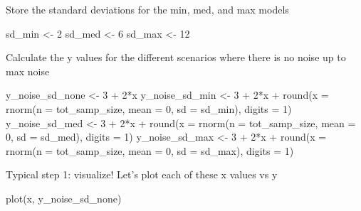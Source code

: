 \documentclass[
]{book}
\newenvironment{Shaded}{\begin{snugshade}}{\end{snugshade}}
\newcommand{\AttributeTok}[1]{\textcolor[rgb]{0.77,0.63,0.00}{#1}}
\newcommand{\DecValTok}[1]{\textcolor[rgb]{0.00,0.00,0.81}{#1}}
\newcommand{\FunctionTok}[1]{\textcolor[rgb]{0.00,0.00,0.00}{#1}}
\newcommand{\NormalTok}[1]{#1}
\newcommand{\OtherTok}[1]{\textcolor[rgb]{0.56,0.35,0.01}{#1}}
\newcommand{\SpecialCharTok}[1]{\textcolor[rgb]{0.00,0.00,0.00}{#1}}
\begin{document}
Store the standard deviations for the min, med, and max models

\begin{Shaded}
\begin{Highlighting}[]
\NormalTok{sd\_min }\OtherTok{\textless{}{-}} \DecValTok{2}
\NormalTok{sd\_med }\OtherTok{\textless{}{-}} \DecValTok{6}
\NormalTok{sd\_max }\OtherTok{\textless{}{-}} \DecValTok{12}
\end{Highlighting}
\end{Shaded}

Calculate the y values for the different scenarios where there is no noise up to max noise

\begin{Shaded}
\begin{Highlighting}[]
\NormalTok{y\_noise\_sd\_none }\OtherTok{\textless{}{-}} \DecValTok{3} \SpecialCharTok{+} \DecValTok{2}\SpecialCharTok{*}\NormalTok{x}
\NormalTok{y\_noise\_sd\_min }\OtherTok{\textless{}{-}} \DecValTok{3} \SpecialCharTok{+} \DecValTok{2}\SpecialCharTok{*}\NormalTok{x }\SpecialCharTok{+} \FunctionTok{round}\NormalTok{(}\AttributeTok{x =} \FunctionTok{rnorm}\NormalTok{(}\AttributeTok{n =}\NormalTok{ tot\_samp\_size, }\AttributeTok{mean =} \DecValTok{0}\NormalTok{, }\AttributeTok{sd =}\NormalTok{ sd\_min), }\AttributeTok{digits =} \DecValTok{1}\NormalTok{)}
\NormalTok{y\_noise\_sd\_med }\OtherTok{\textless{}{-}} \DecValTok{3} \SpecialCharTok{+} \DecValTok{2}\SpecialCharTok{*}\NormalTok{x }\SpecialCharTok{+} \FunctionTok{round}\NormalTok{(}\AttributeTok{x =} \FunctionTok{rnorm}\NormalTok{(}\AttributeTok{n =}\NormalTok{ tot\_samp\_size, }\AttributeTok{mean =} \DecValTok{0}\NormalTok{, }\AttributeTok{sd =}\NormalTok{ sd\_med), }\AttributeTok{digits =} \DecValTok{1}\NormalTok{)}
\NormalTok{y\_noise\_sd\_max }\OtherTok{\textless{}{-}} \DecValTok{3} \SpecialCharTok{+} \DecValTok{2}\SpecialCharTok{*}\NormalTok{x }\SpecialCharTok{+} \FunctionTok{round}\NormalTok{(}\AttributeTok{x =} \FunctionTok{rnorm}\NormalTok{(}\AttributeTok{n =}\NormalTok{ tot\_samp\_size, }\AttributeTok{mean =} \DecValTok{0}\NormalTok{, }\AttributeTok{sd =}\NormalTok{ sd\_max), }\AttributeTok{digits =} \DecValTok{1}\NormalTok{)}
\end{Highlighting}
\end{Shaded}

Typical step 1: visualize! Let's plot each of these x values vs y

\begin{Shaded}
\begin{Highlighting}[]
\FunctionTok{plot}\NormalTok{(x, y\_noise\_sd\_none)}
\end{Highlighting}
\end{Shaded}
\end{document}
